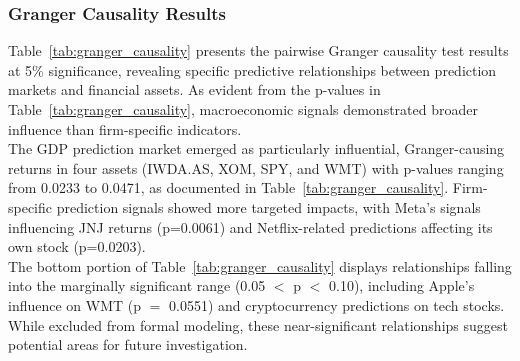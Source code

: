 \documentclass[12pt]{report}
\begin{document}
\subsubsection{Granger Causality Results}
Table~\ref{tab:granger_causality} presents the pairwise Granger causality test results at 5\% significance, revealing specific predictive relationships between prediction markets and financial assets. As evident from the p-values in Table~\ref{tab:granger_causality}, macroeconomic signals demonstrated broader influence than firm-specific indicators.\\

The GDP prediction market emerged as particularly influential, Granger-causing returns in four assets (IWDA.AS, XOM, SPY, and WMT) with p-values ranging from 0.0233 to 0.0471, as documented in Table~\ref{tab:granger_causality}. Firm-specific prediction signals showed more targeted impacts, with Meta's signals influencing JNJ returns (p=0.0061) and Netflix-related predictions affecting its own stock (p=0.0203).\\

The bottom portion of Table~\ref{tab:granger_causality} displays relationships falling into the marginally significant range (0.05 \(<\) p \(<\) 0.10), including Apple's influence on WMT (p \(=\) 0.0551) and cryptocurrency predictions on tech stocks. While excluded from formal modeling, these near-significant relationships suggest potential areas for future investigation.\\
\end{document}
